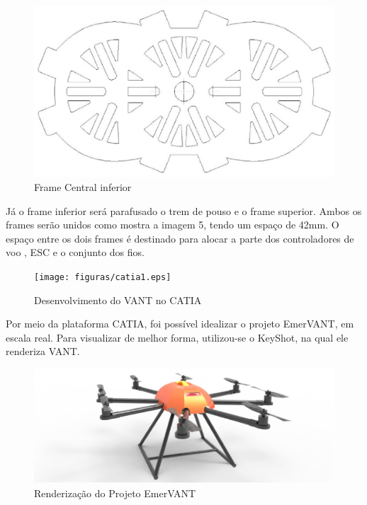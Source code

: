 \begin{figure}[h!]
    \centering
      \includegraphics[keepaspectratio=true,scale=0.5]{figuras/drawinfinfo.eps}
    \caption{ Frame Central inferior}
    \label{fig:drawinfinfo}
\end{figure}

Já o frame inferior será parafusado o trem de pouso e o frame superior. Ambos os frames serão unidos como mostra a imagem 5, tendo um espaço de 42mm. O espaço entre os dois frames é destinado para alocar a parte dos controladores de voo , ESC e o conjunto dos fios.

\begin{figure}[h!]
    \centering
      \texttt{[image: figuras/catia1.eps]}
    \caption{Desenvolvimento do VANT no CATIA}
    \label{fig:catia1}
\end{figure}

Por meio da plataforma CATIA, foi possível idealizar o projeto EmerVANT, em escala real. Para visualizar de melhor forma, utilizou-se o KeyShot, na qual ele renderiza VANT.

\begin{figure}[h!]
    \centering
      \includegraphics[keepaspectratio=true,scale=0.5]{figuras/keyshot1.eps}
    \caption{ Renderização do Projeto EmerVANT}
    \label{fig:keyshot1}
\end{figure}

